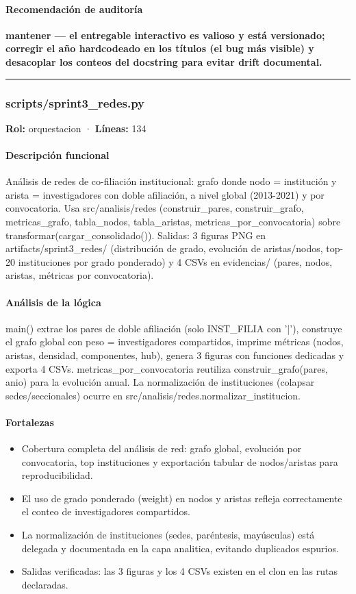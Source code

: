 \paragraph{Recomendación de auditoría}
\textbf{mantener --- el entregable interactivo es valioso y está versionado; corregir el año hardcodeado en los títulos (el bug más visible) y desacoplar los conteos del docstring para evitar drift documental.}

\medskip
\hrule

\subsubsection{scripts/sprint3\_redes.py}
\textbf{Rol:} orquestacion · \textbf{Líneas:} 134

\paragraph{Descripción funcional}
Análisis de redes de co-filiación institucional: grafo donde nodo = institución y arista = investigadores con doble afiliación, a nivel global (2013-2021) y por convocatoria. Usa src/analisis/redes (construir\_pares, construir\_grafo, metricas\_grafo, tabla\_nodos, tabla\_aristas, metricas\_por\_convocatoria) sobre transformar(cargar\_consolidado()). Salidas: 3 figuras PNG en artifacts/sprint3\_redes/ (distribución de grado, evolución de aristas/nodos, top-20 instituciones por grado ponderado) y 4 CSVs en evidencias/ (pares, nodos, aristas, métricas por convocatoria).

\paragraph{Análisis de la lógica}
main() extrae los pares de doble afiliación (solo INST\_FILIA con '|'), construye el grafo global con peso = investigadores compartidos, imprime métricas (nodos, aristas, densidad, componentes, hub), genera 3 figuras con funciones dedicadas y exporta 4 CSVs. metricas\_por\_convocatoria reutiliza construir\_grafo(pares, anio) para la evolución anual. La normalización de instituciones (colapsar sedes/seccionales) ocurre en src/analisis/redes.normalizar\_institucion.

\paragraph{Fortalezas}
\begin{itemize}
  \item Cobertura completa del análisis de red: grafo global, evolución por convocatoria, top instituciones y exportación tabular de nodos/aristas para reproducibilidad.
  \item El uso de grado ponderado (weight) en nodos y aristas refleja correctamente el conteo de investigadores compartidos.
  \item La normalización de instituciones (sedes, paréntesis, mayúsculas) está delegada y documentada en la capa analitica, evitando duplicados espurios.
  \item Salidas verificadas: las 3 figuras y los 4 CSVs existen en el clon en las rutas declaradas.
\end{itemize}

